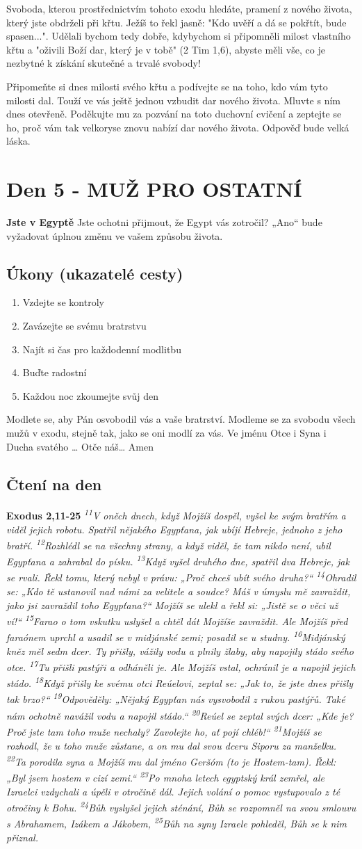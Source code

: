 \documentclass[11pt]{article}
\newcommand{\zacatekPrvniTyden}{
  \textbf{Jste v Egyptě} \newline
  Jste ochotni přijmout, že Egypt vás zotročil? „Ano“ bude vyžadovat úplnou změnu ve vašem způsobu života.

\subsection*{Úkony (ukazatelé cesty)}
\begin{enumerate}
  \item Vzdejte se kontroly
  \item Zavázejte se svému bratrstvu
  \item Najít si čas pro každodenní modlitbu
  \item Buďte radostní
  \item Každou noc zkoumejte svůj den
\end{enumerate}
Modlete se, aby Pán osvobodil vás a vaše bratrství. \newline
Modleme se za svobodu všech mužů v exodu, stejně tak, jako se oni modlí za vás.\newline
Ve jménu Otce i Syna i Ducha svatého …  Otče náš… Amen
}
\begin{document}
Svoboda, kterou prostřednictvím tohoto exodu hledáte, pramení z nového života, který jste obdrželi při křtu.
Ježíš to řekl jasně: "Kdo uvěří a dá se pokřtít, bude spasen...". Udělali bychom tedy dobře, kdybychom si připomněli milost vlastního křtu a "oživili Boží dar, který je v tobě" (2 Tim 1,6), abyste měli vše, co je nezbytné k získání skutečné a trvalé svobody!

Připomeňte si dnes milosti svého křtu a podívejte se na toho, kdo vám tyto milosti dal. Touží ve vás ještě jednou vzbudit dar nového života. Mluvte s ním dnes otevřeně. Poděkujte mu za pozvání na toto duchovní cvičení a zeptejte se ho, proč vám tak velkoryse znovu nabízí dar nového života. Odpověď bude velká láska.

\newpage
\section{Den 5 - MUŽ PRO OSTATNÍ}
\zacatekPrvniTyden
\subsection*{Čtení na den}
\textbf{Exodus 2,11-25}
\newline
\textit{
\textsuperscript{11}V oněch dnech, když Mojžíš dospěl, vyšel ke svým bratřím a viděl jejich robotu. Spatřil nějakého Egypťana, jak ubíjí Hebreje, jednoho z jeho bratří.
\textsuperscript{12}Rozhlédl se na všechny strany, a když viděl, že tam nikdo není, ubil Egypťana a zahrabal do písku.
\textsuperscript{13}Když vyšel druhého dne, spatřil dva Hebreje, jak se rvali. Řekl tomu, který nebyl v právu: „Proč chceš ubít svého druha?“
\textsuperscript{14}Ohradil se: „Kdo tě ustanovil nad námi za velitele a soudce? Máš v úmyslu mě zavraždit, jako jsi zavraždil toho Egypťana?“ Mojžíš se ulekl a řekl si: „Jistě se o věci už ví!“
\textsuperscript{15}Farao o tom vskutku uslyšel a chtěl dát Mojžíše zavraždit. Ale Mojžíš před faraónem uprchl a usadil se v midjánské zemi; posadil se u studny.
\textsuperscript{16}Midjánský kněz měl sedm dcer. Ty přišly, vážily vodu a plnily žlaby, aby napojily stádo svého otce.
\textsuperscript{17}Tu přišli pastýři a odháněli je. Ale Mojžíš vstal, ochránil je a napojil jejich stádo.
\textsuperscript{18}Když přišly ke svému otci Reúelovi, zeptal se: „Jak to, že jste dnes přišly tak brzo?“
\textsuperscript{19}Odpověděly: „Nějaký Egypťan nás vysvobodil z rukou pastýřů. Také nám ochotně navážil vodu a napojil stádo.“
\textsuperscript{20}Reúel se zeptal svých dcer: „Kde je? Proč jste tam toho muže nechaly? Zavolejte ho, ať pojí chléb!“
\textsuperscript{21}Mojžíš se rozhodl, že u toho muže zůstane, a on mu dal svou dceru Siporu za manželku. 
\textsuperscript{22}Ta porodila syna a Mojžíš mu dal jméno Geršóm (to je Hostem-tam). Řekl: „Byl jsem hostem v cizí zemi.“
\textsuperscript{23}Po mnoha letech egyptský král zemřel, ale Izraelci vzdychali a úpěli v otročině dál. Jejich volání o pomoc vystupovalo z té otročiny k Bohu.
\textsuperscript{24}Bůh vyslyšel jejich sténání, Bůh se rozpomněl na svou smlouvu s Abrahamem, Izákem a Jákobem,
\textsuperscript{25}Bůh na syny Izraele pohleděl, Bůh se k nim přiznal.
}
\end{document}
